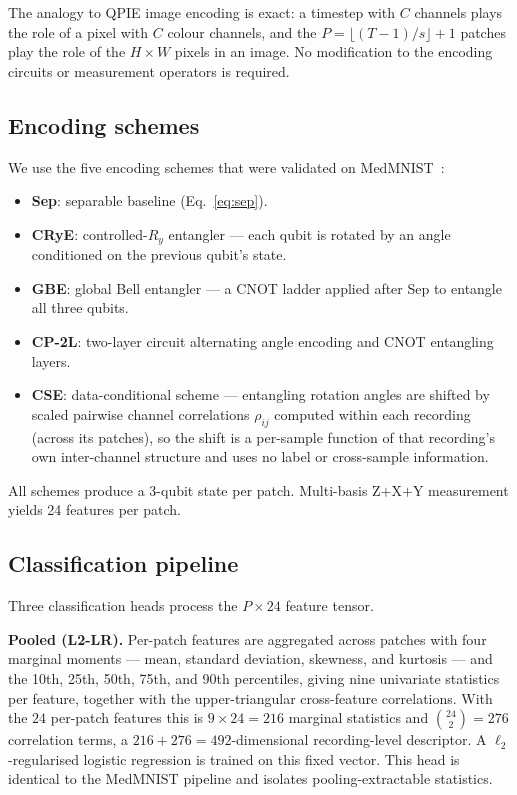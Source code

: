 \documentclass[conference,compsoc]{IEEEtran}
\begin{document}
The analogy to QPIE image encoding is exact: a timestep with $C$
channels plays the role of a pixel with $C$ colour channels, and the
$P = \lfloor(T - 1)/s\rfloor + 1$ patches play the role of the
$H \times W$ pixels in an image.
No modification to the encoding circuits or measurement operators
is required.

\subsection{Encoding schemes}

We use the five encoding schemes that were validated on MedMNIST~\cite{atadana2026qpie}:
\begin{itemize}
  \item \textbf{Sep}: separable baseline (Eq.~\ref{eq:sep}).
  \item \textbf{CRyE}: controlled-$R_y$ entangler — each qubit is
    rotated by an angle conditioned on the previous qubit's state.
  \item \textbf{GBE}: global Bell entangler — a CNOT ladder
    applied after Sep to entangle all three qubits.
  \item \textbf{CP-2L}: two-layer circuit alternating angle
    encoding and CNOT entangling layers.
  \item \textbf{CSE}: data-conditional scheme — entangling rotation
    angles are shifted by scaled pairwise channel correlations
    $\rho_{ij}$ computed within each recording (across its patches),
    so the shift is a per-sample function of that recording's own
    inter-channel structure and uses no label or cross-sample
    information.
\end{itemize}

All schemes produce a 3-qubit state per patch.
Multi-basis Z$+$X$+$Y measurement yields 24 features per patch.

\subsection{Classification pipeline}

Three classification heads process the $P \times 24$ feature tensor.

\textbf{Pooled (L2-LR).}
Per-patch features are aggregated across patches with four marginal
moments --- mean, standard deviation, skewness, and kurtosis --- and
the 10th, 25th, 50th, 75th, and 90th percentiles, giving nine
univariate statistics per feature, together with the
upper-triangular cross-feature correlations.
With the $24$ per-patch features this is
$9 \times 24 = 216$ marginal statistics and
$\binom{24}{2} = 276$ correlation terms, a
$216 + 276 = 492$-dimensional recording-level descriptor.
A $\ell_2$-regularised logistic regression is trained on this fixed
vector.
This head is identical to the MedMNIST pipeline and isolates
pooling-extractable statistics.
\end{document}
